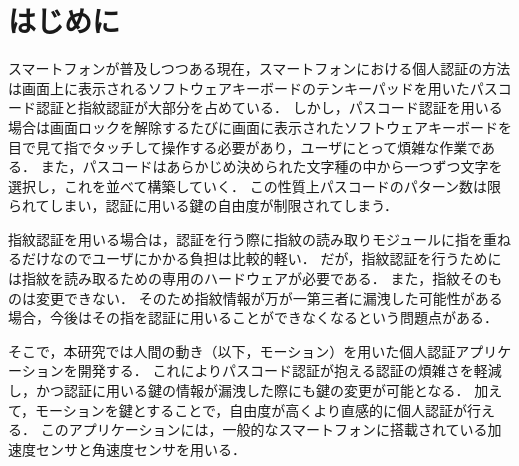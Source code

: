 \section{はじめに}
スマートフォンが普及しつつある現在，スマートフォンにおける個人認証の方法は画面上に表示されるソフトウェアキーボードのテンキーパッドを用いたパスコード認証と指紋認証が大部分を占めている．
しかし，パスコード認証を用いる場合は画面ロックを解除するたびに画面に表示されたソフトウェアキーボードを目で見て指でタッチして操作する必要があり，ユーザにとって煩雑な作業である．
また，パスコードはあらかじめ決められた文字種の中から一つずつ文字を選択し，これを並べて構築していく．
この性質上パスコードのパターン数は限られてしまい，認証に用いる鍵の自由度が制限されてしまう．

指紋認証を用いる場合は，認証を行う際に指紋の読み取りモジュールに指を重ねるだけなのでユーザにかかる負担は比較的軽い．
だが，指紋認証を行うためには指紋を読み取るための専用のハードウェアが必要である．
また，指紋そのものは変更できない．
そのため指紋情報が万が一第三者に漏洩した可能性がある場合，今後はその指を認証に用いることができなくなるという問題点がある．

そこで，本研究では人間の動き（以下，モーション）を用いた個人認証アプリケーションを開発する．
これによりパスコード認証が抱える認証の煩雑さを軽減し，かつ認証に用いる鍵の情報が漏洩した際にも鍵の変更が可能となる．
加えて，モーションを鍵とすることで，自由度が高くより直感的に個人認証が行える．
このアプリケーションには，一般的なスマートフォンに搭載されている加速度センサと角速度センサを用いる．

